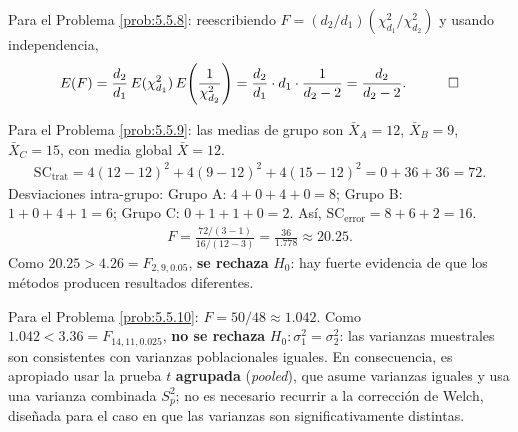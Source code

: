 \begin{solucion}
	\label{sol:5.5.8}
	Para el Problema \ref{prob:5.5.8}: reescribiendo $F=(d_2/d_1)(\chi^2_{d_1}/\chi^2_{d_2})$ y usando independencia,
	\begin{align*}
		E(F) = \frac{d_2}{d_1}\, E(\chi^2_{d_1})\, E\!\left(\frac{1}{\chi^2_{d_2}}\right) = \frac{d_2}{d_1}\cdot d_1 \cdot \frac{1}{d_2-2} = \frac{d_2}{d_2-2}. \quad \qedhere
	\end{align*}
\end{solucion}

\begin{solucion}
	\label{sol:5.5.9}
	Para el Problema \ref{prob:5.5.9}: las medias de grupo son $\bar X_A=12$, $\bar X_B=9$, $\bar X_C=15$, con media global $\bar X = 12$.
	\begin{align*}
		\text{SC}_{\text{trat}} = 4(12-12)^2+4(9-12)^2+4(15-12)^2 = 0+36+36 = 72.
	\end{align*}
	Desviaciones intra-grupo: Grupo A: $4+0+4+0=8$; Grupo B: $1+0+4+1=6$; Grupo C: $0+1+1+0=2$. Así, $\text{SC}_{\text{error}}=8+6+2=16$.
	\begin{align*}
		F = \frac{72/(3-1)}{16/(12-3)} = \frac{36}{1.778} \approx 20.25.
	\end{align*}
	Como $20.25 > 4.26 = F_{2,9,0.05}$, \textbf{se rechaza} $H_0$: hay fuerte evidencia de que los métodos producen resultados diferentes. \quad \qedhere
\end{solucion}

\begin{solucion}
	\label{sol:5.5.10}
	Para el Problema \ref{prob:5.5.10}: $F = 50/48 \approx 1.042$. Como $1.042 < 3.36 = F_{14,11,0.025}$, \textbf{no se rechaza} $H_0:\sigma_1^2=\sigma_2^2$: las varianzas muestrales son consistentes con varianzas poblacionales iguales. En consecuencia, es apropiado usar la prueba $t$ \textbf{agrupada} (\emph{pooled}), que asume varianzas iguales y usa una varianza combinada $S_p^2$; no es necesario recurrir a la corrección de Welch, diseñada para el caso en que las varianzas son significativamente distintas. \quad \qedhere
\end{solucion}
